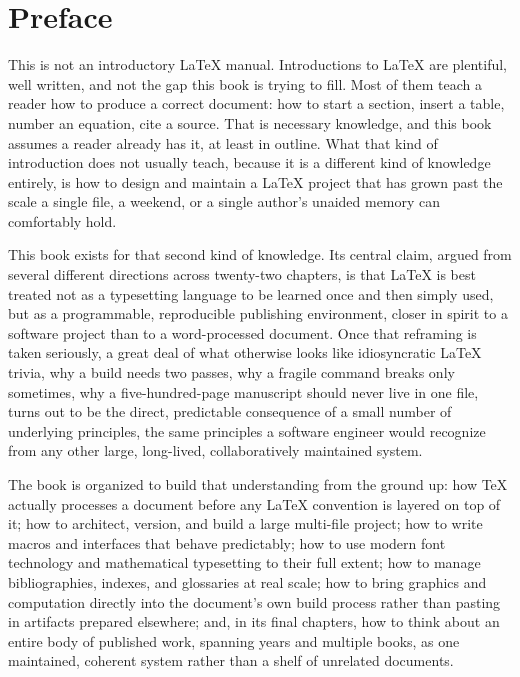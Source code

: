 \chapter*{Preface}

This is not an introductory LaTeX manual. Introductions to LaTeX are plentiful, well written, and not the gap this book is trying to fill. Most of them teach a reader how to produce a correct document: how to start a section, insert a table, number an equation, cite a source. That is necessary knowledge, and this book assumes a reader already has it, at least in outline. What that kind of introduction does not usually teach, because it is a different kind of knowledge entirely, is how to design and maintain a LaTeX project that has grown past the scale a single file, a weekend, or a single author's unaided memory can comfortably hold.

This book exists for that second kind of knowledge. Its central claim, argued from several different directions across twenty-two chapters, is that LaTeX is best treated not as a typesetting language to be learned once and then simply used, but as a programmable, reproducible publishing environment, closer in spirit to a software project than to a word-processed document. Once that reframing is taken seriously, a great deal of what otherwise looks like idiosyncratic LaTeX trivia, why a build needs two passes, why a fragile command breaks only sometimes, why a five-hundred-page manuscript should never live in one file, turns out to be the direct, predictable consequence of a small number of underlying principles, the same principles a software engineer would recognize from any other large, long-lived, collaboratively maintained system.

The book is organized to build that understanding from the ground up: how TeX actually processes a document before any LaTeX convention is layered on top of it; how to architect, version, and build a large multi-file project; how to write macros and interfaces that behave predictably; how to use modern font technology and mathematical typesetting to their full extent; how to manage bibliographies, indexes, and glossaries at real scale; how to bring graphics and computation directly into the document's own build process rather than pasting in artifacts prepared elsewhere; and, in its final chapters, how to think about an entire body of published work, spanning years and multiple books, as one maintained, coherent system rather than a shelf of unrelated documents.

